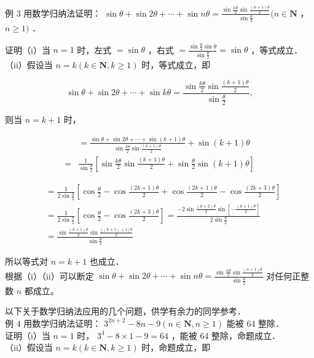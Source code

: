 \documentclass[10pt]{article}
\begin{document}
例 3 用数学归纳法证明： \(\sin \theta+\sin 2 \theta+\cdots+\sin n \theta=\frac{\sin \frac{n \theta}{2} \sin \frac{(n+1) \theta}{2}}{\sin \frac{\theta}{2}}(n \in \mathbf{N}\) ， \(n \geqslant 1)\) ．

证明（i）当 \(n=1\) 时，左式 \(=\sin \theta\) ，右式 \(=\frac{\sin \frac{\theta}{2} \sin \theta}{\sin \frac{\theta}{2}}=\sin \theta\) ，等式成立．\\
（ii）假设当 \(n=k(k \in \mathbf{N}, k \geqslant 1)\) 时，等式成立，即

\[
\sin \theta+\sin 2 \theta+\cdots+\sin k \theta=\frac{\sin \frac{k \theta}{2} \sin \frac{(k+1) \theta}{2}}{\sin \frac{\theta}{2}},
\]

则当 \(n=k+1\) 时，

\[
\begin{aligned}
& =\frac{\sin \theta+\sin 2 \theta+\cdots+\sin (k+1) \theta}{\sin \frac{k \theta}{2} \sin \frac{(k+1) \theta}{2}}+\sin (k+1) \theta \\
= & \frac{1}{\sin \frac{\theta}{2}}\left[\sin \frac{k \theta}{2} \sin \frac{(k+1) \theta}{2}+\sin \frac{\theta}{2} \sin (k+1) \theta\right]
\end{aligned}
\]

\[
\begin{aligned}
& =\frac{1}{2 \sin \frac{\theta}{2}}\left[\cos \frac{\theta}{2}-\cos \frac{(2 k+1) \theta}{2}+\cos \frac{(2 k+1) \theta}{2}-\cos \frac{(2 k+3) \theta}{2}\right] \\
& =\frac{1}{2 \sin \frac{\theta}{2}}\left[\cos \frac{\theta}{2}-\cos \frac{(2 k+3) \theta}{2}\right]=\frac{-2 \sin \frac{(k+2) \theta}{2} \sin \left[-\frac{(k+1) \theta}{2}\right]}{2 \sin \frac{\theta}{2}} \\
& =\frac{\sin \frac{(k+1) \theta}{2} \sin \frac{[(k+1)+1] \theta}{2}}{\sin \frac{\theta}{2}}
\end{aligned}
\]

所以等式对 \(n=k+1\) 也成立．\\
根据（i）（ii）可以断定 \(\sin \theta+\sin 2 \theta+\cdots+\sin n \theta=\frac{\sin \frac{n \theta}{2} \sin \frac{(n+1) \theta}{2}}{\sin \frac{\theta}{2}}\) 对任何正整数 \(n\) 都成立。

以下关于数学归纳法应用的几个问题，供学有余力的同学参考．\\
例 4 用数学归纳法证明： \(3^{2 n+2}-8 n-9(n \in \mathbf{N}, n \geqslant 1)\) 能被 64 整除．\\
证明（i）当 \(n=1\) 时， \(3^{4}-8 \times 1-9=64\) ，能被 64 整除，命题成立．\\
（ii）假设当 \(n=k(k \in \mathbf{N}, k \geqslant 1)\) 时，命题成立，即
\end{document}

